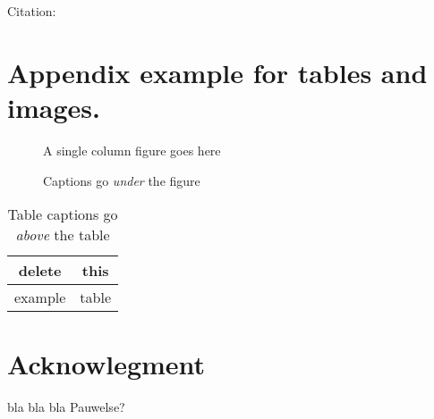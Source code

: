 \documentclass[twocolumn,english,compsoc,journal]{IEEEtran}
\providecommand{\tabularnewline}{\\}
\begin{document}
Citation: \cite{example:beebe_archive}


\section{Appendix example for tables and images.}

\begin{figure}[htbp]
\begin{centering}
\textsf{A single column figure goes here}
\par\end{centering}

\protect\caption{Captions go \emph{under} the figure}
\end{figure}
\begin{table}[htbp]
\protect\caption{Table captions go \emph{above} the table}


\centering{}%
\begin{tabular}{|c|c|}
\hline 
delete & this\tabularnewline
\hline 
\hline 
example & table\tabularnewline
\hline 
\end{tabular}
\end{table}



\section*{Acknowlegment}

bla bla bla Pauwelse?



\end{document}
